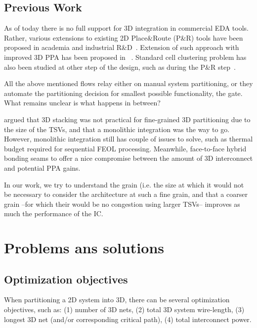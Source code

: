 \documentclass[conference]{IEEEtran}
\begin{document}

\subsection{Previous Work}
As of today there is no full support for 3D integration in commercial EDA tools. Rather, various extensions to existing 2D Place\&Route (P\&R) tools have been proposed in academia and industrial R\&D~\cite{Panth}. %
Extension of such approach with improved 3D PPA has been proposed in ~\cite{Chang2016}. %
Standard cell clustering problem has also been studied at other step of the design, such as during the P\&R step~\cite{Moura2017}. %

All the above mentioned flows relay either on manual system partitioning, or they automate the partitioning decision for smallest possible functionality, the gate. What remains unclear is what happens in between?  

\cite{Samal2017} argued that 3D stacking was not practical for fine-grained 3D partitioning due to the size of the TSVs, and that a monolithic integration was the way to go. However, monolithic integration still has couple of issues to solve, such as thermal budget required for sequential FEOL processing. Meanwhile, face-to-face hybrid bonding seams to offer a nice compromise between the amount of 3D interconnect and potential PPA gains.

In our work, we try to understand the grain (i.e. the size at which it would not be necessary to consider the architecture at such a fine grain, and that a coarser grain --for which their would be no congestion using larger TSVs-- improves as much the performance of the IC.

\section{Problems ans solutions}
\subsection{Optimization objectives}
When partitioning a 2D system into 3D, there can be several optimization objectives, such as: (1) number of 3D nets, (2) total 3D system wire-length, (3) longest 3D net (and/or corresponding critical path), (4) total interconnect power.
\end{document}

